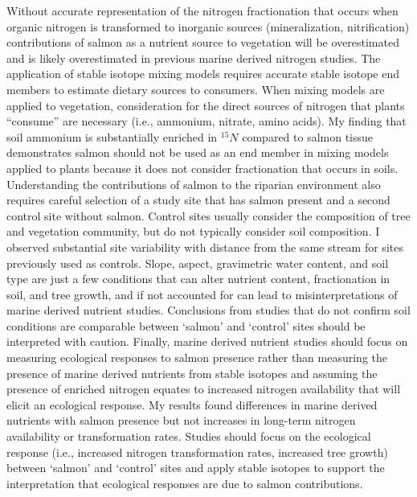 \documentclass [11pt, proquest] {uwthesis}[2015/03/03]
\begin{document}
Without accurate representation of the nitrogen fractionation that
occurs when organic nitrogen is transformed to inorganic sources
(mineralization, nitrification) contributions of salmon as a nutrient
source to vegetation will be overestimated and is likely overestimated
in previous marine derived nitrogen studies. The application of stable
isotope mixing models requires accurate stable isotope end members to
estimate dietary sources to consumers. When mixing models are applied to
vegetation, consideration for the direct sources of nitrogen that plants
``consume'' are necessary (i.e., ammonium, nitrate, amino acids). My
finding that soil ammonium is substantially enriched in \(^{15}N\)
compared to salmon tissue demonstrates salmon should not be used as an
end member in mixing models applied to plants because it does not
consider fractionation that occurs in soils. Understanding the
contributions of salmon to the riparian environment also requires
careful selection of a study site that has salmon present and a second
control site without salmon. Control sites usually consider the
composition of tree and vegetation community, but do not typically
consider soil composition. I observed substantial site variability with
distance from the same stream for sites previously used as controls.
Slope, aspect, gravimetric water content, and soil type are just a few
conditions that can alter nutrient content, fractionation in soil, and
tree growth, and if not accounted for can lead to misinterpretations of
marine derived nutrient studies. Conclusions from studies that do not
confirm soil conditions are comparable between `salmon' and `control'
sites should be interpreted with caution. Finally, marine derived
nutrient studies should focus on measuring ecological responses to
salmon presence rather than measuring the presence of marine derived
nutrients from stable isotopes and assuming the presence of enriched
nitrogen equates to increased nitrogen availability that will elicit an
ecological response. My results found differences in marine derived
nutrients with salmon presence but not increases in long-term nitrogen
availability or transformation rates. Studies should focus on the
ecological response (i.e., increased nitrogen transformation rates,
increased tree growth) between `salmon' and `control' sites and apply
stable isotopes to support the interpretation that ecological responses
are due to salmon contributions.
\end{document}

